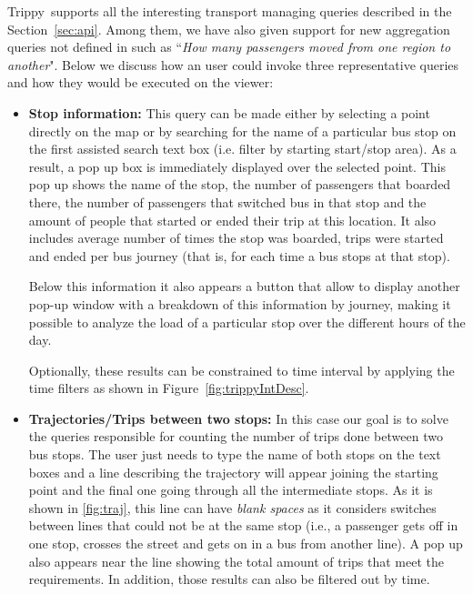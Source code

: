    Trippy\ supports all the interesting transport managing queries described in the Section~\ref{sec:api}. Among them, we have also given support for new aggregation queries not defined in \cite{daniil18} such as ``\textit{How many passengers moved from one region to another}".
    Below we discuss how an user could invoke three representative queries and how they would be executed on the viewer:
    
    \begin{itemize}
        \item \textbf{Stop information:} This query can be made either by selecting a point directly on the map or by searching for the name of a particular bus stop on the first assisted search text box (i.e. filter by starting start/stop area). As a result, a pop up box is immediately displayed over the selected point. This pop up shows the name of the stop, the number of passengers that boarded there, the number of passengers that switched bus in that stop and the amount of people that started or ended their trip at this location. It also includes average number of times the stop was boarded, trips were started and ended per bus journey (that is, for each time a bus stops at that stop).
        
        Below this information it also appears a button that allow to display another pop-up window with a breakdown of this information by journey, making it possible to analyze the load of a particular stop over the different hours of the day.
    
        Optionally, these results can be constrained to time interval by applying the time filters as shown in Figure~\ref{fig:trippyIntDesc}. 
        
        
        \item \textbf{Trajectories/Trips between two stops:} In this case our goal is to solve the queries responsible for counting the number of trips done between two bus stops. The user just needs to type the name of both stops on the text boxes and a line describing the trajectory will appear joining the starting point and the final one going through all the intermediate stops. As it is shown in \ref{fig:traj}, this line can have \textit{blank spaces} as it considers switches between lines that could not be at the same stop (i.e., a passenger gets off in one stop, crosses the street and gets on in a bus from another line). A pop up also appears near the line showing the total amount of trips that meet the requirements. In addition, those results can also be filtered out by time.
        

\end{itemize}
